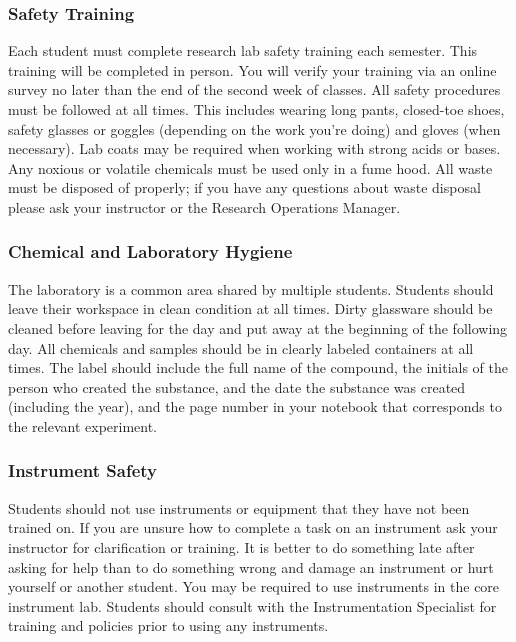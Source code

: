 \documentclass[11pt]{article}
\begin{document}
\subsubsection{Safety Training}
\label{sec:org217eb7b}

Each student must complete research lab safety training each semester. This training will be completed in person. You will verify your training via an online survey no later than the end of the second week of classes. All safety procedures must be followed at all times. This includes wearing long pants, closed-toe shoes, safety glasses or goggles (depending on the work you’re doing) and gloves (when necessary). Lab coats may be required when working with strong acids or bases. Any noxious or volatile chemicals must be used only in a fume hood. All waste must be disposed of properly; if you have any questions about waste disposal please ask your instructor or the Research Operations Manager.

\subsubsection{Chemical and Laboratory Hygiene}
\label{sec:org88993d5}

The laboratory is a common area shared by multiple students. Students should leave their workspace in clean condition at all times. Dirty glassware should be cleaned before leaving for the day and put away at the beginning of the following day. All chemicals and samples should be in clearly labeled containers at all times. The label should include the full name of the compound, the initials of the person who created the substance, and the date the substance was created (including the year), and the page number in your notebook that corresponds to the relevant experiment.

\subsubsection{Instrument Safety}
\label{sec:org1f559a9}

Students should not use instruments or equipment that they have not been trained on. If you are unsure how to complete a task on an instrument ask your instructor for clarification or training. It is better to do something late after asking for help than to do something wrong and damage an instrument or hurt yourself or another student. You may be required to use instruments in the core instrument lab. Students should consult with the Instrumentation Specialist for training and policies prior to using any instruments.
\end{document}
